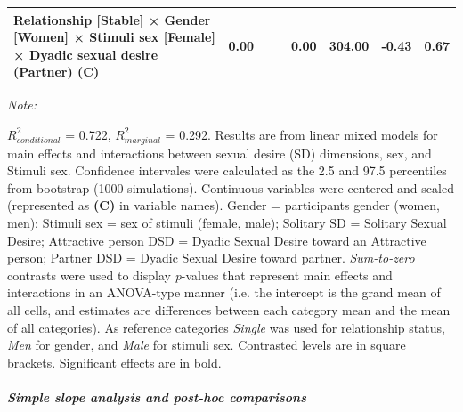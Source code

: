\documentclass[
  bookmarksnumbered]{article}
\begin{document}
\begin{table}[H]
{\begin{threeparttable}
\begin{tabular}[t]{lccccccc}
Relationship [Stable] × Gender [Women] × Stimuli sex [Female] × Dyadic sexual desire (Partner) (C) & 0.00 &  &  & 0.00 & 304.00 & -0.43 & 0.67\\
\bottomrule
\end{tabular}
\begin{tablenotes}[para]
\item \textit{Note: } 
\item $R^2_{conditional}$ = 0.722, $R^2_{marginal}$ = 0.292. Results are from linear mixed models for main 
                              effects and interactions between sexual desire (SD) dimensions,
                              sex, and Stimuli sex.
                              Confidence intervales were calculated as the 2.5 and 97.5 
                              percentiles from bootstrap (1000 simulations).
                              Continuous variables were centered and scaled
                              (represented as \textbf{(C)} in variable names).
                              Gender = participants gender (women, men); 
                              Stimuli sex = sex of stimuli (female, male); 
                              Solitary SD = Solitary Sexual Desire;
                              Attractive person DSD = Dyadic Sexual Desire toward an 
                              Attractive person;
                              Partner DSD = Dyadic Sexual Desire toward partner.
                              \textit{Sum-to-zero} contrasts were used to display
                              \textit{p}-values that represent main effects and interactions 
                              in an ANOVA-type manner (i.e. the intercept is the grand mean of 
                              all cells, and estimates are differences between each category
                              mean and the mean of all categories).
                              As reference categories 
                              \textit{Single} was used for relationship status,
                              \textit{Men} for gender,
                              and \textit{Male} for stimuli sex. 
                              Contrasted levels are in square brackets. 
                              Significant effects are in bold.
\end{tablenotes}
\end{threeparttable}}
\end{table}

\hypertarget{simple-slope-analysis-and-post-hoc-comparisons-1}{%
\subparagraph{\texorpdfstring{Simple slope analysis and \emph{post-hoc} comparisons}{Simple slope analysis and post-hoc comparisons}}\label{simple-slope-analysis-and-post-hoc-comparisons-1}}
\end{document}
